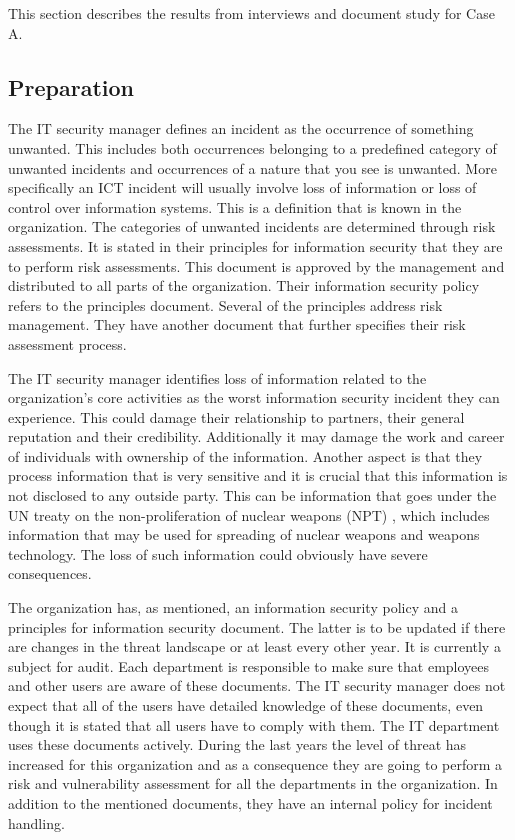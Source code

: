 This section describes the results from interviews and document study for Case A. 

\subsection{Preparation}
The IT security manager defines an incident %
as the occurrence of something unwanted. This includes both occurrences belonging to a predefined category of unwanted incidents and occurrences of a nature that you see is unwanted. More specifically an \ac{ICT} incident will usually involve loss of information or loss of control over information systems. This is a definition that is known in the organization. The categories of unwanted incidents are determined through risk assessments. It is stated in their principles for information security that they are to perform risk assessments. This document is approved by the management and distributed to all parts of the organization. Their information security policy refers to the principles document. Several of the principles address risk management. They have another document that further specifies their risk assessment process. %

The IT security manager identifies loss of information related to the organization's core activities as the worst information security incident they can experience. This could damage their relationship to partners, their general reputation and their credibility. Additionally it may damage the work and career of individuals with ownership of the information. %
Another aspect is that they process information that is very sensitive and it is crucial that this information is not disclosed to any outside party. This can be information that goes under the \ac{UN} treaty on the non-proliferation of nuclear weapons (NPT) \cite{NPT}, which includes information that may be used for spreading of nuclear weapons and weapons technology. %
The loss of such information could obviously have severe consequences.

The organization has, as mentioned, an information security policy and a principles for information security document. The latter is to be updated if there are changes in the threat landscape or at least every other year. It is currently a subject for audit. Each department is responsible to make sure that employees and other users are aware of these documents. The IT security manager does not expect that all of the users have detailed knowledge of these documents, even though it is stated that all users have to comply with them. The IT department uses these documents actively. %
During the last years the level of threat has increased for this organization and as a consequence they are going to perform a risk and vulnerability assessment for all the departments in the organization. In addition to the mentioned documents, they have an internal policy for incident handling.

